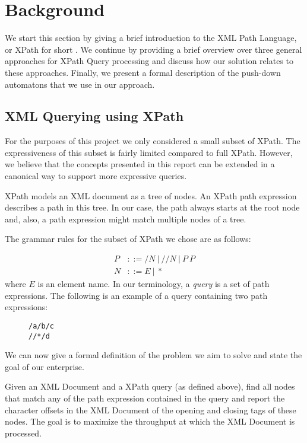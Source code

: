 \section{Background}\label{sec:background}
We start this section by giving a brief introduction to the XML Path Language,
or XPath for short \cite{xpathSpec}. We continue by providing a brief overview
over three general approaches for XPath Query processing and discuss how our
solution relates to these approaches. Finally, we present a formal description
of the push-down automatons that we use in our approach.

\subsection{XML Querying using XPath}

For the purposes of this project we only considered a small subset of XPath.
The expressiveness of this subset is fairly limited compared to full XPath.
However, we believe that the concepts presented in this report can be extended
in a canonical way to support more expressive queries.

XPath models an XML document as a tree of nodes. An XPath path expression
describes a path in this tree. In our case, the path always starts at the root
node and, also, a path expression might match multiple nodes of a tree.

The grammar rules for the subset of XPath we chose are as follows:

\begin{align*}
    P &::= /N\ |\ //N\ |\ P\ P\\
    N &::= E\ |\ *
\end{align*}
where $E$ is an element name. In our terminology, a \emph{query} is a set of
path expressions. The following is an example of a query containing two path
expressions:

\begin{figure}[htb]
\centering
\texttt{/a/b/c}\\
\texttt{//*/d}
\end{figure}

We can now give a formal definition of the problem we aim to solve and state
the goal of our enterprise. 

 Given an XML Document and a XPath query (as
defined above), find all nodes that match any of the path expression contained
in the query and report the character offsets in the XML Document of the
opening and closing tags of these nodes. The goal is to maximize the throughput
at which the XML Document is processed.

